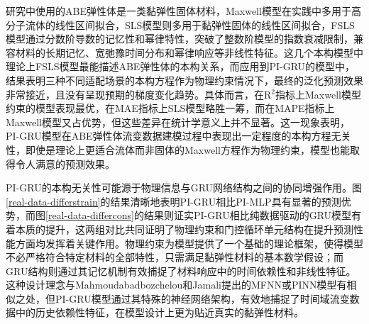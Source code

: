 研究中使用的ABE弹性体是一类黏弹性固体材料，Maxwell模型在实践中多用于高分子流体的线性区间拟合，SLS模型则多用于黏弹性固体的线性区间拟合，FSLS模型通过分数阶导数的记忆性和幂律特性，突破了整数阶模型的指数衰减限制，兼容材料的长期记忆、宽弛豫时间分布和幂律响应等非线性特征\cite{ricarteTutorialReviewLinear2024,ewoldtDesigningComplexFluids2022}。这几个本构模型中理论上FSLS模型最能描述ABE弹性体的本构关系，而应用到PI-GRU的模型中，结果表明三种不同适配场景的本构方程作为物理约束情况下，最终的泛化预测效果非常接近，且没有呈现预期的梯度变化趋势。具体而言，在R$^2$指标上Maxwell模型约束的模型表现最优，在MAE指标上SLS模型略胜一筹，而在MAPE指标上Maxwell模型又占优势，但这些差异在统计学意义上并不显著。这一现象表明，PI-GRU模型在ABE弹性体流变数据建模过程中表现出一定程度的本构方程无关性，即使是理论上更适合流体而非固体的Maxwell方程作为物理约束，模型也能取得令人满意的预测效果。

PI-GRU的本构无关性可能源于物理信息与GRU网络结构之间的协同增强作用。图\ref{real-data-differstrain}的结果清晰地表明PI-GRU相比PI-MLP具有显著的预测优势，而图\ref{real-data-differcons}的结果则证实PI-GRU相比纯数据驱动的GRU模型有着本质的提升，这两组对比共同证明了物理约束和门控循环单元结构在提升预测性能方面均发挥着关键作用。物理约束为模型提供了一个基础的理论框架，使得模型不必严格符合特定材料的全部特性，只需满足黏弹性材料的基本数学假设；而GRU结构则通过其记忆机制有效捕捉了材料响应中的时间依赖性和非线性特征。这种设计理念与Mahmoudabadbozchelou和Jamali提出的MFNN或PINN模型有相似之处\cite{mahmoudabadbozchelouDatadrivenPhysicsinformedConstitutive2021}，但PI-GRU模型通过其特殊的神经网络架构，有效地捕捉了时间域流变数据中的历史依赖性特征，在模型设计上更为贴近真实的黏弹性材料。

